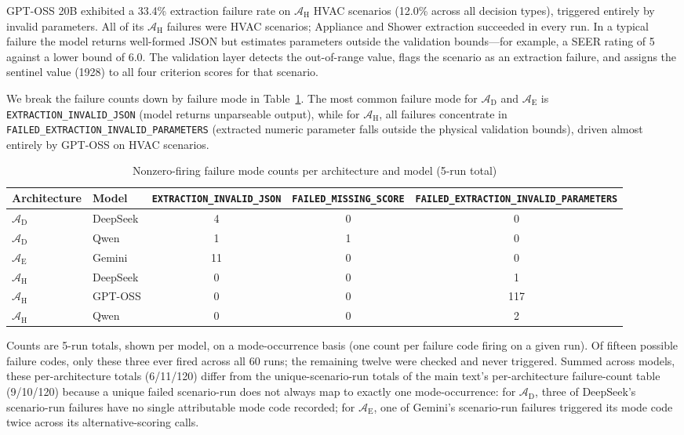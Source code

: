 \documentclass[11pt]{article}
\begin{document}
GPT-OSS 20B exhibited a 33.4\% extraction failure rate on
$\mathcal{A}_{\text{H}}$ HVAC scenarios (12.0\% across all decision types),
triggered entirely by invalid parameters. All of its $\mathcal{A}_{\text{H}}$
failures were HVAC scenarios; Appliance and Shower extraction succeeded in
every run. In a typical failure the model returns well-formed JSON but
estimates parameters outside the validation bounds---for example, a SEER rating of 5 against a
lower bound of 6.0. The validation layer detects the out-of-range value,
flags the scenario as an extraction failure, and assigns the sentinel
value (1928) to all four criterion scores for that scenario.

We break the failure counts down by failure mode in Table~\ref{tab:failure_modes}. The most common failure mode for $\mathcal{A}_{\text{D}}$ and $\mathcal{A}_{\text{E}}$ is \texttt{EXTRACTION\_INVALID\_\allowbreak JSON} (model returns unparseable output), while for $\mathcal{A}_{\text{H}}$, all failures concentrate in \texttt{FAILED\_EXTRACTION\_\allowbreak INVALID\_\allowbreak PARAMETERS} (extracted numeric parameter falls outside the physical validation bounds), driven almost entirely by GPT-OSS on HVAC scenarios.

\begin{table}[htbp]
\small\centering
\caption{Nonzero-firing failure mode counts per architecture and model (5-run total)}
\label{tab:failure_modes}
\begin{tabular}{llccc}
\toprule
Architecture & Model & \texttt{EXTRACTION\_INVALID\_JSON} & \texttt{FAILED\_MISSING\_SCORE} & \texttt{FAILED\_EXTRACTION\_INVALID\_PARAMETERS} \\
\midrule
$\mathcal{A}_{\text{D}}$ & DeepSeek & 4 & 0 & 0 \\
$\mathcal{A}_{\text{D}}$ & Qwen & 1 & 1 & 0 \\
$\mathcal{A}_{\text{E}}$ & Gemini & 11 & 0 & 0 \\
$\mathcal{A}_{\text{H}}$ & DeepSeek & 0 & 0 & 1 \\
$\mathcal{A}_{\text{H}}$ & GPT-OSS & 0 & 0 & 117 \\
$\mathcal{A}_{\text{H}}$ & Qwen & 0 & 0 & 2 \\
\bottomrule
\end{tabular}
\end{table}


Counts are 5-run totals, shown per model, on a mode-occurrence basis (one count per failure code firing on a given run). Of fifteen possible failure codes, only these three ever fired across all 60 runs; the remaining twelve were checked and never triggered. Summed across models, these per-architecture totals (6/11/120) differ from the unique-scenario-run totals of the main text's per-architecture failure-count table (9/10/120) because a unique failed scenario-run does not always map to exactly one mode-occurrence: for $\mathcal{A}_{\text{D}}$, three of DeepSeek's scenario-run failures have no single attributable mode code recorded; for $\mathcal{A}_{\text{E}}$, one of Gemini's scenario-run failures triggered its mode code twice across its alternative-scoring calls.
\end{document}
